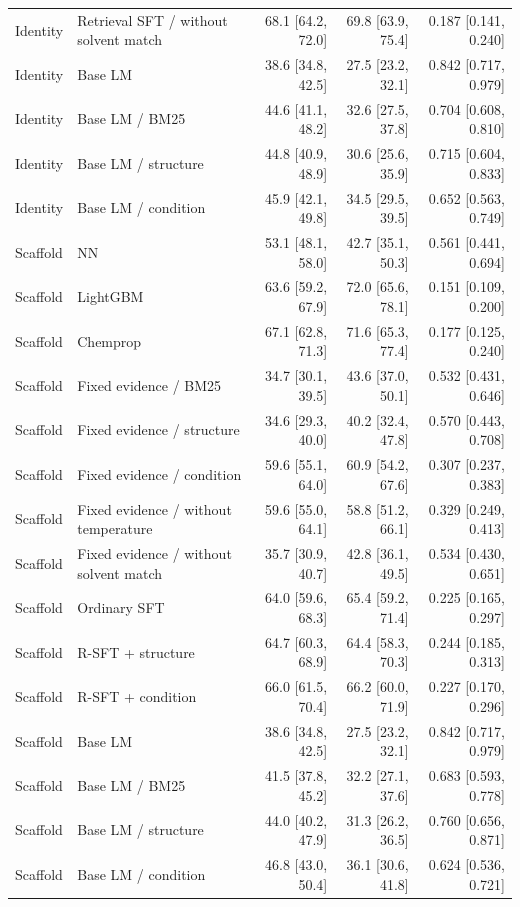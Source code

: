 \begin{longtable}{lp{.27\linewidth}rrr}
Identity & Retrieval SFT / without solvent match & 68.1 [64.2, 72.0] & 69.8 [63.9, 75.4] & 0.187 [0.141, 0.240] \\
Identity & Base LM & 38.6 [34.8, 42.5] & 27.5 [23.2, 32.1] & 0.842 [0.717, 0.979] \\
Identity & Base LM / BM25 & 44.6 [41.1, 48.2] & 32.6 [27.5, 37.8] & 0.704 [0.608, 0.810] \\
Identity & Base LM / structure & 44.8 [40.9, 48.9] & 30.6 [25.6, 35.9] & 0.715 [0.604, 0.833] \\
Identity & Base LM / condition & 45.9 [42.1, 49.8] & 34.5 [29.5, 39.5] & 0.652 [0.563, 0.749] \\
Scaffold & NN & 53.1 [48.1, 58.0] & 42.7 [35.1, 50.3] & 0.561 [0.441, 0.694] \\
Scaffold & LightGBM & 63.6 [59.2, 67.9] & 72.0 [65.6, 78.1] & 0.151 [0.109, 0.200] \\
Scaffold & Chemprop & 67.1 [62.8, 71.3] & 71.6 [65.3, 77.4] & 0.177 [0.125, 0.240] \\
Scaffold & Fixed evidence / BM25 & 34.7 [30.1, 39.5] & 43.6 [37.0, 50.1] & 0.532 [0.431, 0.646] \\
Scaffold & Fixed evidence / structure & 34.6 [29.3, 40.0] & 40.2 [32.4, 47.8] & 0.570 [0.443, 0.708] \\
Scaffold & Fixed evidence / condition & 59.6 [55.1, 64.0] & 60.9 [54.2, 67.6] & 0.307 [0.237, 0.383] \\
Scaffold & Fixed evidence / without temperature & 59.6 [55.0, 64.1] & 58.8 [51.2, 66.1] & 0.329 [0.249, 0.413] \\
Scaffold & Fixed evidence / without solvent match & 35.7 [30.9, 40.7] & 42.8 [36.1, 49.5] & 0.534 [0.430, 0.651] \\
Scaffold & Ordinary SFT & 64.0 [59.6, 68.3] & 65.4 [59.2, 71.4] & 0.225 [0.165, 0.297] \\
Scaffold & R-SFT + structure & 64.7 [60.3, 68.9] & 64.4 [58.3, 70.3] & 0.244 [0.185, 0.313] \\
Scaffold & R-SFT + condition & 66.0 [61.5, 70.4] & 66.2 [60.0, 71.9] & 0.227 [0.170, 0.296] \\
Scaffold & Base LM & 38.6 [34.8, 42.5] & 27.5 [23.2, 32.1] & 0.842 [0.717, 0.979] \\
Scaffold & Base LM / BM25 & 41.5 [37.8, 45.2] & 32.2 [27.1, 37.6] & 0.683 [0.593, 0.778] \\
Scaffold & Base LM / structure & 44.0 [40.2, 47.9] & 31.3 [26.2, 36.5] & 0.760 [0.656, 0.871] \\
Scaffold & Base LM / condition & 46.8 [43.0, 50.4] & 36.1 [30.6, 41.8] & 0.624 [0.536, 0.721] \\
\bottomrule
\end{longtable}
\endgroup

